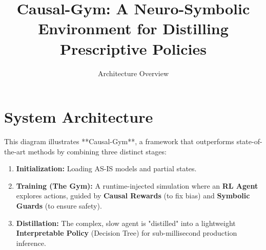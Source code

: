 \documentclass[a4paper]{article}
\begin{document}
\title{\textbf{Causal-Gym: A Neuro-Symbolic Environment for Distilling Prescriptive Policies}}
\author{Architecture Overview}
\date{}
\maketitle

\section{System Architecture}

This diagram illustrates **Causal-Gym**, a framework that outperforms state-of-the-art methods by combining three distinct stages:
\begin{enumerate}
    \item \textbf{Initialization:} Loading AS-IS models and partial states.
    \item \textbf{Training (The Gym):} A runtime-injected simulation where an \textbf{RL Agent} explores actions, guided by \textbf{Causal Rewards} (to fix bias) and \textbf{Symbolic Guards} (to ensure safety).
    \item \textbf{Distillation:} The complex, slow agent is "distilled" into a lightweight \textbf{Interpretable Policy} (Decision Tree) for sub-millisecond production inference.
\end{enumerate}
\end{document}
